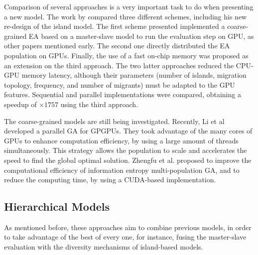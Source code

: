 \documentclass{article}
\begin{document}
Comparison of several approaches is a very important task to do when presenting a new model. The work by \cite{LUONG:2010:INRIA-00520464:1} compared three different schemes, including his new re-design of the island model. The first scheme presented implemented a coarse-grained EA based on a master-slave model to run the evaluation step on GPU, as other papers mentioned early. The second one directly distributed the EA population on GPUs. Finally, the use of a fast on-chip memory was proposed as an extension on the third approach.
The two latter approaches reduced the CPU-GPU memory latency, although their parameters (number of islands, migration topology, frequency, and number of migrants) must be adapted to the GPU features. Sequential and parallel implementations were compared, obtaining a speedup of $\times1757$ using the third approach.


The coarse-grained models are still being investigated. Recently, Li et al \cite{Li2016} developed a parallel GA for GPGPUs. They took advantage of the many cores of GPUs to enhance computation efficiency, by using a large amount of threads simultaneously. This strategy allows the population to scale and accelerates the speed to find the global optimal solution. Zhengfu et al. \cite{Zhengfu2016} proposed to improve the computational efficiency of information entropy multi-population GA, and to reduce the computing time, by using a CUDA-based implementation.


\subsection{Hierarchical Models}

As mentioned before, these approaches aim to combine previous models, in order to take advantage of the best of every one, for instance, fusing the master-slave evaluation with the diversity mechanisms of island-based models.
\end{document}
